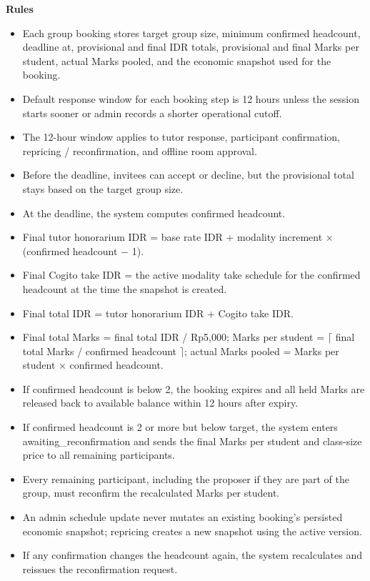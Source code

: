\documentclass[11pt,a4paper]{article}
\begin{document}
\textbf{Rules}
\begin{itemize}
    \item Each group booking stores target group size, minimum confirmed headcount, deadline at, provisional and final IDR totals, provisional and final Marks per student, actual Marks pooled, and the economic snapshot used for the booking.
    \item Default response window for each booking step is 12 hours unless the session starts sooner or admin records a shorter operational cutoff.
    \item The 12-hour window applies to tutor response, participant confirmation, repricing / reconfirmation, and offline room approval.
    \item Before the deadline, invitees can accept or decline, but the provisional total stays based on the target group size.
    \item At the deadline, the system computes confirmed headcount.
    \item Final tutor honorarium IDR = base rate IDR + modality increment $\times$ (confirmed headcount $-$ 1).
    \item Final Cogito take IDR = the active modality take schedule for the confirmed headcount at the time the snapshot is created.
    \item Final total IDR = tutor honorarium IDR + Cogito take IDR.
    \item Final total Marks = final total IDR / Rp5,000; Marks per student = $\lceil$ final total Marks / confirmed headcount $\rceil$; actual Marks pooled = Marks per student $\times$ confirmed headcount.
    \item If confirmed headcount is below 2, the booking expires and all held Marks are released back to available balance within 12 hours after expiry.
    \item {\sloppy If confirmed headcount is 2 or more but below target, the system enters awaiting\_reconfirmation and sends the final Marks per student and class-size price to all remaining participants.\par}
    \item Every remaining participant, including the proposer if they are part of the group, must reconfirm the recalculated Marks per student.
    \item An admin schedule update never mutates an existing booking's persisted economic snapshot; repricing creates a new snapshot using the active version.
    \item If any confirmation changes the headcount again, the system recalculates and reissues the reconfirmation request.

\end{itemize}
\end{document}

